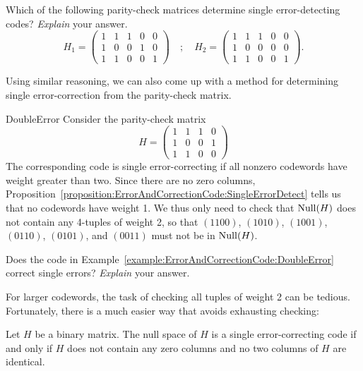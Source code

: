 \begin{exercise}{}
 Which of the following parity-check matrices determine single error-detecting codes? \emph{Explain} your answer.
\[
H_1 =
\left(
\begin{array}{ccccc}
1 & 1 & 1 & 0 & 0 \\
1 & 0 & 0 & 1 & 0 \\
1 & 1 & 0 & 0 & 1
\end{array}
\right)
\quad ; \quad
H_2 =
\left(
\begin{array}{ccccc}
1 & 1 & 1 & 0 & 0 \\
1 & 0 & 0 & 0 & 0 \\
1 & 1 & 0 & 0 & 1
\end{array}
\right).
\]
\end{exercise}
 
Using similar reasoning, we can also come up with a method for determining single error-correction from the parity-check matrix.
 
\begin{example}{DoubleError}
Consider the parity-check matrix
\[
H =
\left(
\begin{array}{cccc}
1 & 1 & 1 & 0 \\
1 & 0 & 0 & 1 \\
1 & 1 & 0 & 0
\end{array}
\right)
\]
The corresponding code is single error-correcting if all nonzero codewords have weight greater than two. Since there are no zero columns, Proposition~\ref{proposition:ErrorAndCorrectionCode:SingleErrorDetect} tells us that no codewords have weight 1. We thus only need to check that  ${\rm Null}(H)$ does not contain any 4-tuples of weight
2, so that $(1100)$, $(1010)$, $(1001)$, $(0110)$, $(0101)$, and
$(0011)$ must not be in ${\rm Null}(H)$.
\end{example}

\begin{exercise}{}
Does the code in Example~\ref{example:ErrorAndCorrectionCode:DoubleError} correct single errors? \emph{Explain} your answer.
\end{exercise}

For larger codewords, the task of checking all tuples of weight 2 can be tedious. Fortunately, there is a much easier way that avoids exhausting checking:
 
\begin{prop}{}
Let $H$ be a binary matrix. The null space of $H$ is a single
error-correcting code if and only if $H$ does not contain any zero
columns and no two columns of $H$ are identical.
\end{prop}
 
